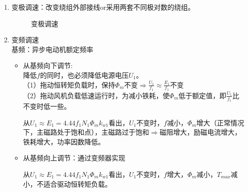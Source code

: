 \documentclass[blue]{elegantnote}
\begin{document}
\begin{enumerate}
\begin{enumerate}
			\item 变极调速：改变绕组外部接线or采用两套不同极对数的绕组。
			\begin{figure}[!hbtp]
				\centering
				\caption{变极调速}                    
				\label{figur:bjts}                                                        
			\end{figure}
			\item 变频调速\\
			基频：异步电动机额定频率
			\begin{itemize}
				\item 从基频向下调节:
				\\{\color{thid}降低$f$的同时，也必须降低电源电压$U_1$。}\\
				（1）拖动恒转矩负载时，保持$\Phi_m$不变$\Rightarrow\frac{U_1}{f_1}\approx\frac{E_1}{f_1}$不变\\
				（2）拖动风机负载低速运行时，{\color{blue}为减小铁耗}，使$\Phi_m$低于额定值，即$\frac{U_1}{f_1}$比不变时低一些。
				\begin{note}
					从$U_1\approx E_1=4.44f_1N_1\Phi_mk_{w1}$看出，$U_1$不变时，$f$减小，$\Phi_m$增大（正常情况下，主磁路处于饱和点），主磁路过于饱和$\Rightarrow$磁阻增大，励磁电流增大，铁耗增大，功率因数降低。
				\end{note}
				\item 从基频向上调节：通过变频器实现
				\begin{note}
					从$U_1\approx E_1=4.44f_1N_1\Phi_mk_{w1}$看出，$U_1$不变时，$f$增大，$\Phi_m$减小，$T_{max}$减小，不适合驱动恒转矩负载。
				\end{note}
			\end{itemize}
		\end{enumerate}

\end{enumerate}
\end{document}
